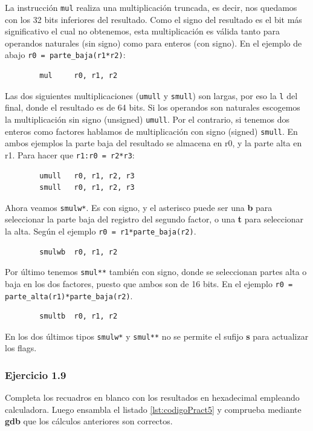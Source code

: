 La instrucción {\tt mul} realiza una multiplicación truncada, es decir,
nos quedamos con los 32 bits inferiores del resultado. Como el signo
del resultado es el bit más significativo el cual no obtenemos, esta
multiplicación es válida tanto para operandos naturales (sin signo) como
para enteros (con signo). En el ejemplo de abajo {\tt r0 = parte\_baja(r1*r2)}:

\begin{lstlisting}
        mul     r0, r1, r2
\end{lstlisting}

Las dos siguientes multiplicaciones ({\tt umull} y {\tt smull}) son largas,
por eso la {\tt l} del final, donde el resultado es de 64 bits. Si los
operandos son naturales escogemos la multiplicación sin signo (unsigned) {\tt umull}.
Por el contrario, si tenemos dos enteros como factores hablamos de
multiplicación con signo (signed) {\tt smull}. En ambos ejemplos la parte baja del
resultado se almacena en r0, y la parte alta en r1. Para hacer que {\tt r1:r0 = r2*r3}:

\begin{lstlisting}
        umull   r0, r1, r2, r3
        smull   r0, r1, r2, r3
\end{lstlisting}

Ahora veamos {\tt smulw*}. Es con signo, y el asterisco puede ser una {\bf b} para
seleccionar la parte baja del registro del segundo factor, o una {\bf t} para
seleccionar la alta. Según el ejemplo {\tt r0 = r1*parte\_baja(r2)}.

\begin{lstlisting}
        smulwb  r0, r1, r2
\end{lstlisting}

Por último tenemos {\tt smul**} también con signo, donde se seleccionan partes
alta o baja en los dos factores, puesto que ambos son de 16 bits. En el ejemplo
{\tt r0 = parte\_alta(r1)*parte\_baja(r2)}.

\begin{lstlisting}
        smultb  r0, r1, r2
\end{lstlisting}

En los dos últimos tipos {\tt smulw*} y {\tt smul**} no se permite el sufijo {\bf s}
para actualizar los flags.

\subsubsection{Ejercicio 1.9}
Completa los recuadros en blanco con los resultados en hexadecimal empleando
calculadora. Luego ensambla el listado \ref{lst:codigoPract5} y comprueba
mediante {\bf gdb} que los cálculos anteriores son correctos.

